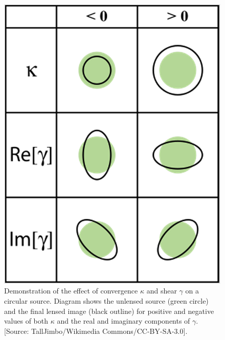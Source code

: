 \begin{figure}
\begin{center}
\includegraphics[scale=0.3]{plots_intro/kappa_gamma.png}
\caption[$\kappa$ and $\gamma$ Diagram]{Demonstration of the effect of convergence $\kappa$ and shear $\gamma$ on a circular source. Diagram shows the unlensed source (green circle) and the final lensed image (black outline) for positive and negative values of both $\kappa$ and the real and imaginary components of $\gamma$. [Source: TallJimbo/Wikimedia Commons/CC-BY-SA-3.0].}
\label{plot:kappagamma}
\end{center}
\end{figure}

